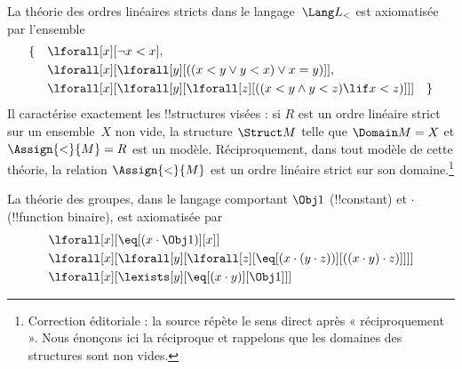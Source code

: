 \documentclass[../../../include/open-logic-section]{subfiles}
\begin{document}


\begin{ex}
La théorie des ordres linéaires stricts dans le langage~$\Lang L_<$
est axiomatisée par l'ensemble
\begin{align*}
\{\quad & \lforall[x][\lnot x < x], \\
& \lforall[x][\lforall[y][((x < y \lor y <
    x) \lor x = y)]], \\
& \lforall[x][\lforall[y][\lforall[z][((x < y
      \land y < z) \lif x < z)]]] \quad \}
\end{align*}
Il caractérise exactement les !!{structure}s visées : si $R$
est un ordre linéaire strict sur un ensemble~$X$ non vide, la structure
$\Struct M$ telle que $\Domain M = X$ et $\Assign{<}{M} = R$ est un modèle.
Réciproquement, dans tout modèle de cette théorie, la relation
$\Assign{<}{M}$ est un ordre linéaire strict sur son domaine.\footnote{Correction éditoriale : la source répète le sens direct après « réciproquement ». Nous énonçons ici la réciproque et rappelons que les domaines des structures sont non vides.}
\end{ex}

\begin{ex}
La théorie des groupes, dans le langage comportant $\Obj 1$
(!!{constant}) et $\cdot$ (!!{function} binaire), est axiomatisée
par
\begin{align*}
& \lforall[x][\eq[(x \cdot \Obj 1)][x]]\\
& \lforall[x][\lforall[y][\lforall[z][\eq[(x \cdot (y \cdot z))][((x
          \cdot y) \cdot z)]]]]\\
& \lforall[x][\lexists[y][\eq[(x \cdot y)][\Obj 1]]]
\end{align*}
\end{ex}
\end{document}

